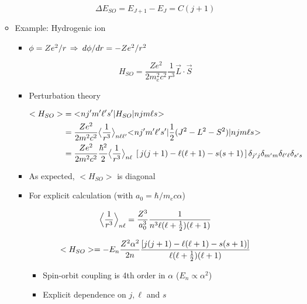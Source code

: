 \documentclass[12pt,letterpaper]{article}
\begin{document}
\begin{Aenumerate}
\begin{itemize}
\begin{itemize}
\begin{itemize}
\begin{equation*}
\Delta E_{SO} = E_{J+1} - E_J = C (j+1)
\end{equation*}

		\end{itemize}

	\item Example:  Hydrogenic ion

		\begin{itemize}
		\item $\phi = Z e^2/r \, \Rightarrow \> d \phi/dr = -Z e^2/r^2$

\begin{equation*}
H_{SO} = \frac{Z e^2}{2 m_e^2 c^2} \frac{1}{r^3} \vec L \cdot \vec S
\end{equation*}

		\item Perturbation theory

\begin{align*}
<H_{SO}> &= {<\negmedspace n j' m' \ell' s'|} H_{SO} {|n j m \ell s\negmedspace>} \\
         &= \frac{Ze^2}{2 m^2 c^2} \big< \frac{1}{r^3} \big>_{n \ell \ell'}
            {<\negmedspace n j' m' \ell' s'|} \frac{1}{2} (J^2 - L^2 - S^2) {|n j m \ell s\negmedspace>} \\
         &= \frac{Ze^2}{2 m^2 c^2} \frac{\hbar^2}{2} 
	  \big< \frac{1}{r^3} \big>_{n \ell} \;
	  \left [ \, j(j+1) - \ell(\ell+1) - s(s+1) \, \right ]
	  \delta_{j'j} \delta_{m'm} \delta_{\ell' \ell} \delta_{s' s}
\end{align*}

		\item As expected, $<H_{SO}>$ is diagonal
		\item For explicit calculation (with $a_0 = \hbar/m_e c \alpha$)

\begin{equation}
\Big< \frac{1}{r^3} \Big>_{n \ell} = \frac{Z^3}{a_0^3} 
   \frac{1}{n^3 \ell (\ell + \frac{1}{2}) (\ell + 1)} 
\end{equation}

\begin{equation}
<H_{SO}> = -E_n \frac{Z^2 \alpha^2}{2n} \frac{[j(j+1) - \ell(\ell+1) - s(s+1)]}{
	\ell(\ell+\frac{1}{2})(\ell+1)}
\end{equation}
			\begin{itemize}
			\item Spin-orbit coupling is 4th order in $\alpha$ ($E_n \propto \alpha^2$)
			\item Explicit dependence on $j,\ell$ and $s$
			\end{itemize}


\end{itemize}
\end{itemize}
\end{itemize}
\end{Aenumerate}
\end{document}
